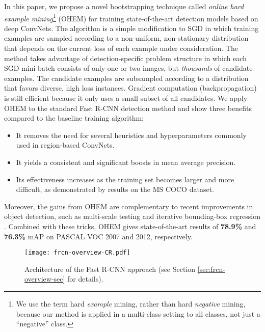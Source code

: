 \documentclass[10pt,twocolumn,letterpaper]{article}
\begin{document}
In this paper, we propose a novel bootstrapping technique called \emph{online hard example mining}\footnote{We use the term hard \emph{example} mining, rather than hard \emph{negative} mining, because our method is applied in a multi-class setting to all classes, not just a ``negative'' class.} (OHEM) for training state-of-the-art detection models based on deep ConvNets. The algorithm is a simple modification to SGD in which training examples are sampled according to a non-uniform, non-stationary distribution that depends on the current loss of each example under consideration. The method takes advantage of detection-specific problem structure in which each SGD mini-batch consists of only one or two images, but \emph{thousands} of candidate examples. The candidate examples are subsampled according to a distribution that favors diverse, high loss instances. Gradient computation (backpropagation) is still efficient because it only uses a small subset of all candidates. We apply OHEM to the standard Fast R-CNN detection method and show three benefits compared to the baseline training algorithm:

\begin{itemize}
\item It removes the need for several heuristics and hyperparameters commonly used in region-based ConvNets.
\item It yields a consistent and significant boosts in mean average precision.
\item Its effectiveness increases as the training set becomes larger and more difficult, as demonstrated by results on the MS COCO dataset.
\end{itemize}

Moreover, the gains from OHEM are complementary to recent improvements in object detection, such as multi-scale testing \cite{SPPnet} and iterative bounding-box regression \cite{mrcnn}. Combined with these tricks, OHEM gives state-of-the-art results of \textbf{78.9\%} and \textbf{76.3\%} mAP on PASCAL VOC 2007 and 2012, respectively.



\begin{figure*}[!ht]
	\centering
	\texttt{[image: frcn-overview-CR.pdf]}
  \caption[caption]{Architecture of the Fast R-CNN approach (see Section \protect\ref{sec:frcn-overview-sec} for details).}\vspace{-0.15in}
	\label{fig:frcn-overview}
\end{figure*}
\end{document}
